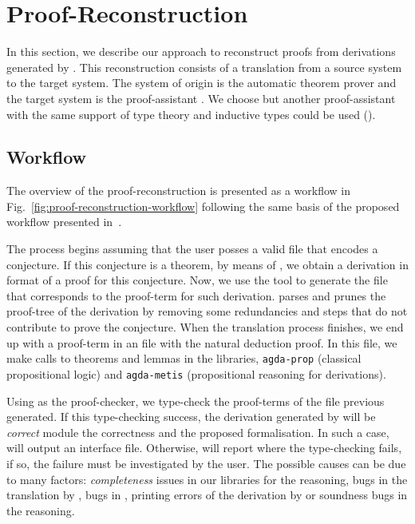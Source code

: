 \documentclass[../itp-2018.tex]{subfiles}
\begin{document}

\section{Proof-Reconstruction}
\label{sec:proof-reconstruction}

In this section, we describe our approach to reconstruct proofs from
\CPL derivations generated by \Metis. This reconstruction consists of
a translation from a source system to the target system. The system of
origin is the automatic theorem prover \Metis and the target system is
the proof-assistant \Agda. We choose \Agda but another proof-assistant
with the same support of type theory and inductive types could be used
(\eg \Coq).

\subsection{Workflow}
\label{ssec:workflow}



The overview of the proof-reconstruction is presented as a workflow
in Fig.~\ref{fig:proof-reconstruction-workflow} following the same
basis of the proposed workflow presented in~\cite{sultana2015}.

The process begins assuming that the user posses a \TPTP valid file that encodes
a \CPL conjecture. If this conjecture is a theorem, by means of \Metis, we
obtain a derivation in \TSTP format of a proof for this conjecture. Now, we use
the \Athena tool to generate the \Agda file that corresponds to the proof-term
for such \TSTP derivation. \Athena parses and prunes the proof-tree of the \TSTP
derivation by removing some redundancies and steps that do not contribute to
prove the conjecture. When the translation process finishes, we end up with a
proof-term in an \Agda file with the natural deduction proof. In this file, we
make calls to theorems and lemmas in the \Agda libraries, \texttt{agda-prop}
(classical propositional logic) and \texttt{agda-metis} (propositional reasoning
for \Metis derivations).

Using \Agda as the proof-checker, we type-check the proof-terms of the \Agda
file previous generated. If this type-checking success, the \TSTP derivation
generated by \Metis will be \emph{correct} module the \Agda correctness and the
proposed formalisation. In such a case, \Agda will output an interface file.
Otherwise, \Agda will report where the type-checking fails, if so, the failure
must be investigated by the user. The possible causes can be due to many
factors: \emph{completeness} issues in our \Agda libraries for the \Metis
reasoning, bugs in the translation by \Athena, bugs in \Agda, printing errors of
the \TSTP derivation by \Metis or soundness bugs in the \Metis reasoning.
\end{document}
